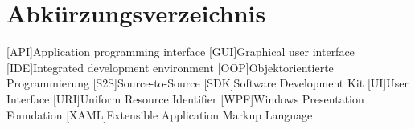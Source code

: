 \chapter{Abkürzungsverzeichnis}
\begin{acronym}[XAML]
[API]{Application programming interface}
[GUI]{Graphical user interface}
[IDE]{Integrated development environment}
[OOP]{Objektorientierte Programmierung}
[S2S]{Source-to-Source}
[SDK]{Software Development Kit}
[UI]{User Interface}
[URI]{Uniform Resource Identifier}
[WPF]{Windows Presentation Foundation}
[XAML]{Extensible Application Markup Language}

\end{acronym}